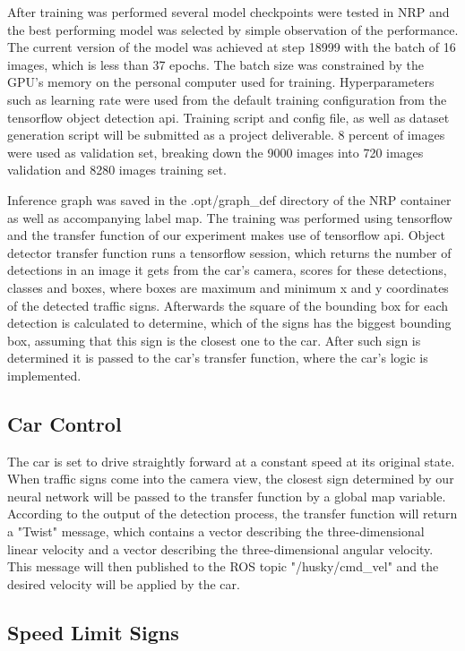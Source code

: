 After training was performed several model checkpoints were tested in NRP and the best performing model was selected by simple observation of the performance. The current version of the model was achieved at step 18999 with the batch of 16 images, which is less than 37 epochs. The batch size was constrained by the GPU's memory on the personal computer used for training. Hyperparameters such as learning rate were used from the default training configuration from the tensorflow object detection api. Training script and config file, as well as dataset generation script will be submitted as a project deliverable. 8 percent of images were used as validation set, breaking down the 9000 images into 720 images validation and 8280 images training set.


Inference graph was saved in the .opt/graph\_def directory of the NRP container as well as accompanying label map. The training was performed using tensorflow and the transfer function of our experiment makes use of tensorflow api. Object detector transfer function runs a tensorflow session, which returns the number of detections in an image it gets from the car's camera, scores for these detections, classes and boxes, where boxes are maximum and minimum x and y coordinates of the detected traffic signs. Afterwards the square of the bounding box for each detection is calculated to determine, which of the signs has the biggest bounding box, assuming that this sign is the closest one to the car. After such sign is determined it is passed to the car's transfer function, where the car's logic is implemented. 

\subsection{Car Control}
The car is set to drive straightly forward at a constant speed at its original state. When traffic signs come into the camera view, the closest sign determined by our neural network will be passed to the transfer function by a global map variable. According to the output of the detection process, the transfer function will return a "Twist" message, which contains a vector describing the three-dimensional linear velocity and a vector describing the three-dimensional angular velocity. This message will then published to the ROS topic "/husky/cmd\_vel" and the desired velocity will be applied by the car.


\subsection{Speed Limit Signs}

